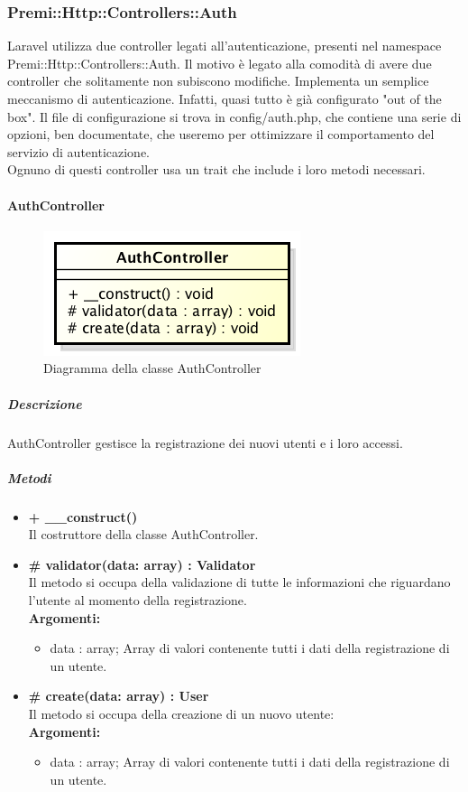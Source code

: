\newpage
\subsubsection{Premi::Http::Controllers::Auth}
\gls{Laravel} utilizza due controller legati all'autenticazione, presenti nel namespace Premi::Http::Controllers::Auth. Il motivo è legato alla comodità di avere due controller che solitamente non subiscono modifiche. 
Implementa un semplice meccanismo di autenticazione. Infatti, quasi tutto è già configurato "out of the box". Il file di configurazione si trova in config/auth.php, che contiene una serie di opzioni, ben documentate, che useremo per ottimizzare il comportamento del servizio di autenticazione.\\
Ognuno di questi controller usa un \gls{trait} che include i loro metodi necessari.
	\paragraph{AuthController}
	\begin{figure}[h]
\centering
\includegraphics[width=0.5\linewidth]{img/back_end_http_controllers_authController}
\caption[Diagramma della classe AuthController]{Diagramma della classe AuthController}
\label{fig:back_end_http_controllers_authController}
\end{figure}
		\subparagraph{Descrizione}
			AuthController gestisce la registrazione dei nuovi utenti e i loro accessi.
		\subparagraph{Metodi}
			\begin{itemize}
				\item \textbf{+ \_\_construct()}\\
				Il costruttore della classe AuthController.
				\item \textbf{\# validator(data: array) : Validator}\\
				Il metodo si occupa della validazione di tutte le informazioni che riguardano l'utente al momento della registrazione.\\
					\textbf{Argomenti:}
						\begin{itemize}
							\item data : array;
							Array di valori contenente tutti i dati della registrazione di un utente. 
						\end{itemize}
				\item \textbf{\# create(data: array) : User}\\
				Il metodo si occupa della creazione di un nuovo utente:\\
					\textbf{Argomenti:}
						\begin{itemize}
							\item data : array;
							Array di valori contenente tutti i dati della registrazione di un utente.
						\end{itemize}
			\end{itemize}
		
